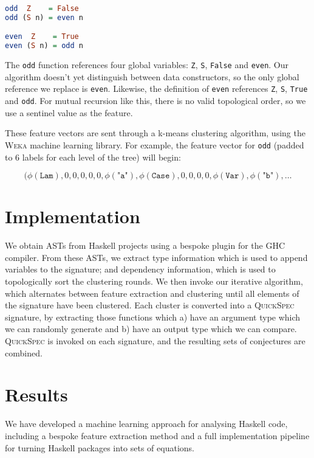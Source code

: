 \documentclass[]{default}
\newcommand{\feature}[1]{\phi(#1)}
\newcommand{\id}[1]{\texttt{"#1"}}
\newcommand{\CVar}{\texttt{Var}}
\newcommand{\CLam}{\texttt{Lam}}
\newcommand{\CCase}{\texttt{Case}}
\begin{document}
\begin{lstlisting}[language=Haskell]
odd  Z    = False
odd (S n) = even n

even  Z    = True
even (S n) = odd n
\end{lstlisting}

The \texttt{odd} function references four global variables: \texttt{Z}, \texttt{S}, \texttt{False} and \texttt{even}. Our algorithm doesn't yet distinguish between data constructors, so the only global reference we replace is \texttt{even}. Likewise, the definition of \texttt{even} references \texttt{Z}, \texttt{S}, \texttt{True} and \texttt{odd}. For mutual recursion like this, there is no valid topological order, so we use a sentinel value as the feature.

These feature vectors are sent through a k-means clustering algorithm, using the \textsc{Weka} machine learning library. For example, the feature vector for \texttt{odd} (padded to 6 labels for each level of the tree) will begin:

\begin{equation*}
  (\feature{\CLam}, 0, 0, 0, 0, 0, \feature{\id{a}}, \feature{\CCase}, 0, 0, 0, 0, \feature{\CVar}, \feature{\id{b}}, \dots
\end{equation*}

\section{Implementation}\label{implementation}

We obtain ASTs from Haskell projects using a bespoke plugin for the GHC
compiler. From these ASTs, we extract type information which is used to append variables to the signature; and dependency information, which is used to topologically sort the clustering rounds. We then invoke our iterative algorithm, which alternates between feature extraction and clustering until all elements of the signature have been clustered. Each cluster is converted into a \textsc{QuickSpec} signature, by extracting those functions which a) have an argument type which we can randomly generate and b) have an output type which we can compare. \textsc{QuickSpec} is invoked on each signature, and the resulting sets of conjectures are combined.

\section{Results}\label{results}

We have developed a machine learning approach for analysing Haskell code, including a
bespoke feature extraction method and a full implementation pipeline for turning Haskell packages into sets of equations.
\end{document}

